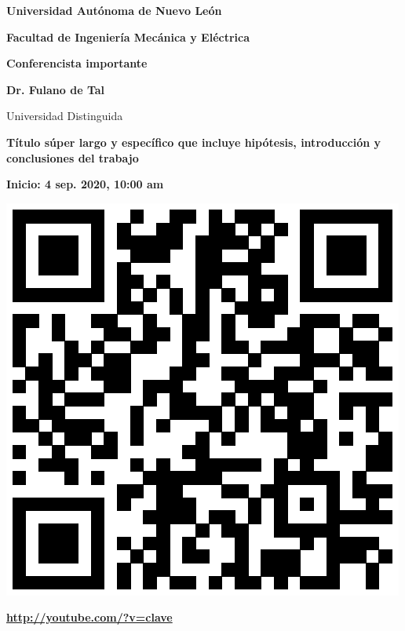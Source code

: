 \documentclass{article}	%
\newcommand{\universityname}{Universidad Autónoma de Nuevo León}
\newcommand{\conferencedate}{4 sep. 2020, 10:00 am}
\newcommand{\openspeakername}{Dr. Fulano de Tal}
\newcommand{\openspeakeruniversity}{Universidad Distinguida}
\newcommand{\titulo}{Título súper largo y específico que incluye hipótesis, introducción y conclusiones del trabajo}
\newcommand{\conferencepage}{\url{http://youtube.com/?v=clave}}
\begin{document}
\begin{minipage}[l][.7\textheight][t]{.90\linewidth} \centering \vspace{-1.5in}
\begin{adjustwidth}{50pt}{100pt}
\begin{center}
\fontsize{20}{45} \selectfont  
\textbf{\universityname} \par\vspace{-0.5cm}
\textbf{Facultad de Ingeniería Mecánica y Eléctrica} \par\vspace{0.3in}
\fontsize{24}{26} \selectfont  

\textbf{Conferencista importante} \par\vspace{0.3cm}
\fontsize{32}{34} \selectfont  
\textbf{\openspeakername} \par\vspace{0.3cm}
\fontsize{18}{20} \selectfont  
\textsf{\openspeakeruniversity} \par\vspace{0.5cm}

\end{center}
\fontsize{28}{30} \selectfont  
\textbf{\titulo} \par\vspace{0.3in}
\begin{center}
\fontsize{24}{26} \selectfont  
\textbf{Inicio: \conferencedate} \par\vspace{0.3in}
\fontsize{14}{16} \selectfont
\includegraphics[scale=.4]{qr_plantilla.eps} \par\vspace{-0.3cm}
\textbf{\conferencepage} \par
\fontsize{16}{32} \selectfont 


\end{center}
\end{adjustwidth}
\end{minipage}
\end{document}
